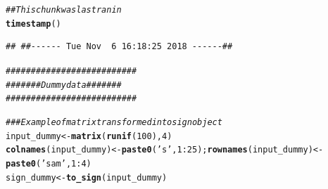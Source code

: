 \documentclass{article}\usepackage[]{graphicx}\usepackage[]{color}
\makeatletter
\newcommand{\hlnum}[1]{\textcolor[rgb]{0.686,0.059,0.569}{#1}}%
\newcommand{\hlstr}[1]{\textcolor[rgb]{0.192,0.494,0.8}{#1}}%
\newcommand{\hlcom}[1]{\textcolor[rgb]{0.678,0.584,0.686}{\textit{#1}}}%
\newcommand{\hlopt}[1]{\textcolor[rgb]{0,0,0}{#1}}%
\newcommand{\hlstd}[1]{\textcolor[rgb]{0.345,0.345,0.345}{#1}}%
\newcommand{\hlkwb}[1]{\textcolor[rgb]{0.69,0.353,0.396}{#1}}%
\newcommand{\hlkwd}[1]{\textcolor[rgb]{0.737,0.353,0.396}{\textbf{#1}}}%
\newenvironment{kframe}{%
 \def\at@end@of@kframe{}%
 \ifinner\ifhmode%
  \def\at@end@of@kframe{\end{minipage}}%
  \begin{minipage}{\columnwidth}%
 \fi\fi%
 \def\FrameCommand##1{\hskip\@totalleftmargin \hskip-\fboxsep
 \colorbox{shadecolor}{##1}\hskip-\fboxsep
     \hskip-\linewidth \hskip-\@totalleftmargin \hskip\columnwidth}%
 \MakeFramed {\advance\hsize-\width
   \@totalleftmargin\z@ \linewidth\hsize
   \@setminipage}}%
 {\par\unskip\endMakeFramed%
 \at@end@of@kframe}
\newenvironment{knitrout}{}{} %
\makeatother
\begin{document}
\begin{knitrout}
\color{fgcolor}\begin{kframe}
\begin{alltt}
\hlcom{## This chunk was last ran in}
\hlkwd{timestamp}\hlstd{()}
\end{alltt}
\begin{verbatim}
## ##------ Tue Nov  6 16:18:25 2018 ------##
\end{verbatim}
\begin{alltt}
\hlcom{##########################}
\hlcom{####### Dummy data #######}
\hlcom{##########################}

\hlcom{### Example of matrix transformed into sign object}
\hlstd{input_dummy} \hlkwb{<-} \hlkwd{matrix}\hlstd{(}\hlkwd{runif}\hlstd{(}\hlnum{100}\hlstd{),} \hlnum{4}\hlstd{)}
\hlkwd{colnames}\hlstd{(input_dummy)} \hlkwb{<-} \hlkwd{paste0}\hlstd{(}\hlstr{'s'}\hlstd{,} \hlnum{1}\hlopt{:}\hlnum{25}\hlstd{);} \hlkwd{rownames}\hlstd{(input_dummy)} \hlkwb{<-} \hlkwd{paste0}\hlstd{(}\hlstr{'sam'}\hlstd{,} \hlnum{1}\hlopt{:}\hlnum{4}\hlstd{)}
\hlstd{sign_dummy} \hlkwb{<-} \hlkwd{to_sign}\hlstd{(input_dummy)}
\end{alltt}
\end{kframe}
\end{knitrout}
\end{document}
